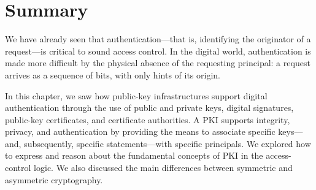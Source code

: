 




\section{Summary}

We have already seen that authentication---that is, identifying the
originator of a request---is critical to sound access control.  In the
digital world, authentication is made more difficult by the physical
absence of the requesting principal: a request arrives as a sequence of
bits, with only hints of its origin.  

In this chapter, we saw how public-key infrastructures support digital
authentication through the use of public and private keys, digital
signatures, public-key certificates, and certificate authorities.  A PKI
supports integrity, privacy, and authentication by providing the means
to associate specific keys---and, subsequently, specific
statements---with specific principals.  We explored how to express and
reason about the fundamental concepts of PKI in the access-control
logic. We also discussed the main differences between symmetric
and asymmetric cryptography.

